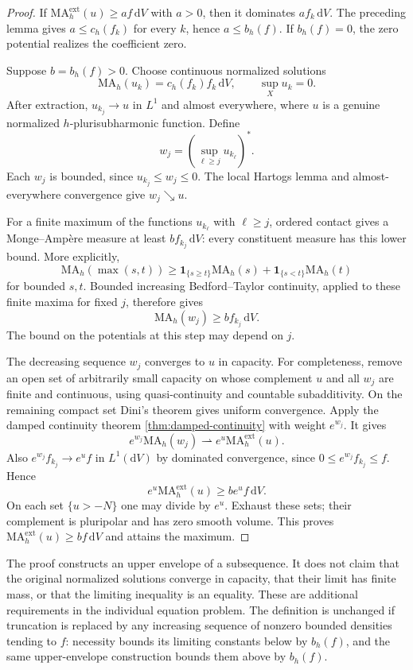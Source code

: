 \begin{proof}
If $\mathrm{MA}^{\mathrm{ext}}_h(u)\geq af\,\mathrm{d}V$ with $a>0$, then it dominates $af_k\,\mathrm{d}V$. The preceding lemma gives $a\leq c_h(f_k)$ for every $k$, hence $a\leq b_h(f)$. If $b_h(f)=0$, the zero potential realizes the coefficient zero.

Suppose $b=b_h(f)>0$. Choose continuous normalized solutions
\[
 \mathrm{MA}_h(u_k)=c_h(f_k)f_k\,\mathrm{d}V,
 \qquad \sup_Xu_k=0.
\]
After extraction, $u_{k_j}\to u$ in $L^1$ and almost everywhere, where $u$ is a genuine normalized $h$-plurisubharmonic function. Define
\[
 w_j=\left(\sup_{\ell\geq j}u_{k_\ell}\right)^*.
\]
Each $w_j$ is bounded, since $u_{k_j}\leq w_j\leq0$. The local Hartogs lemma and almost-everywhere convergence give $w_j\searrow u$.

For a finite maximum of the functions $u_{k_\ell}$ with $\ell\geq j$, ordered contact gives a Monge--Amp\`ere measure at least $bf_{k_j}\,\mathrm{d}V$: every constituent measure has this lower bound. More explicitly,
\[
 \mathrm{MA}_h(\max(s,t))\geq
 \mathbf1_{\{s\geq t\}}\mathrm{MA}_h(s)
 +\mathbf1_{\{s<t\}}\mathrm{MA}_h(t)
\]
for bounded $s,t$. Bounded increasing Bedford--Taylor continuity, applied to these finite maxima for fixed $j$, therefore gives
\[
 \mathrm{MA}_h(w_j)\geq bf_{k_j}\,\mathrm{d}V.
\]
The bound on the potentials at this step may depend on $j$.

The decreasing sequence $w_j$ converges to $u$ in capacity. For completeness, remove an open set of arbitrarily small capacity on whose complement $u$ and all $w_j$ are finite and continuous, using quasi-continuity and countable subadditivity. On the remaining compact set Dini's theorem gives uniform convergence. Apply the damped continuity theorem \cref{thm:damped-continuity} with weight $e^{w_j}$. It gives
\[
 e^{w_j}\mathrm{MA}_h(w_j)
       \rightharpoonup e^u\mathrm{MA}^{\mathrm{ext}}_h(u).
\]
Also $e^{w_j}f_{k_j}\to e^uf$ in $L^1(\mathrm{d}V)$ by dominated convergence, since $0\leq e^{w_j}f_{k_j}\leq f$. Hence
\[
 e^u\mathrm{MA}^{\mathrm{ext}}_h(u)\geq be^uf\,\mathrm{d}V.
\]
On each set $\{u>-N\}$ one may divide by $e^u$. Exhaust these sets; their complement is pluripolar and has zero smooth volume. This proves $\mathrm{MA}^{\mathrm{ext}}_h(u)\geq bf\,\mathrm{d}V$ and attains the maximum.
\end{proof}

The proof constructs an upper envelope of a subsequence. It does not claim that the original normalized solutions converge in capacity, that their limit has finite mass, or that the limiting inequality is an equality. These are additional requirements in the individual equation problem. The definition is unchanged if truncation is replaced by any increasing sequence of nonzero bounded densities tending to $f$: necessity bounds its limiting constants below by $b_h(f)$, and the same upper-envelope construction bounds them above by $b_h(f)$.

